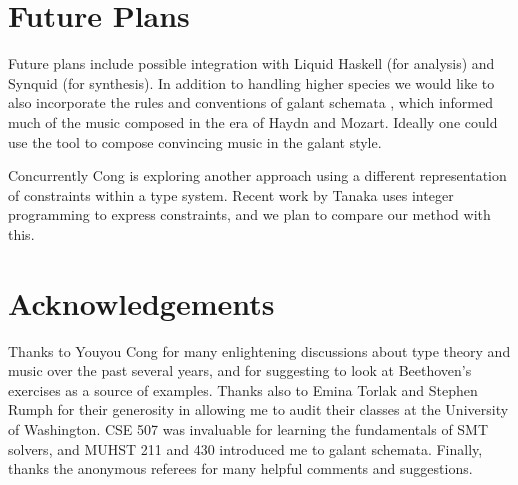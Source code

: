 \documentclass[sigplan,screen]{acmart}
\begin{document}
\section{Future Plans}

Future plans include possible integration with Liquid Haskell
\citep{LiquidHaskell} (for analysis) and Synquid \citep{Synquid} (for
synthesis). In addition to handling higher species we would like to
also incorporate the rules and conventions of galant schemata
\citep{Gjerdingen2007}, which informed much of the music composed in
the era of Haydn and Mozart. Ideally one could use the tool to compose
convincing music in the galant style.

Concurrently Cong \citep{Cong2022a,Cong2022c} is exploring another approach
using a different representation of constraints within a type system.
Recent work by Tanaka \citep{Tanaka2022} uses integer programming to
express constraints, and we plan to compare our method with this.

\section*{Acknowledgements}

Thanks to Youyou Cong for many enlightening discussions about type
theory and music over the past several years, and for suggesting to
look at Beethoven's exercises as a source of examples. Thanks also to
Emina Torlak and Stephen Rumph for their generosity in allowing me to
audit their classes at the University of Washington. CSE 507 was
invaluable for learning the fundamentals of SMT 
solvers, and MUHST 211 and 430 introduced me to galant schemata.
Finally, thanks the anonymous referees for many helpful comments and
suggestions.


\end{document}
